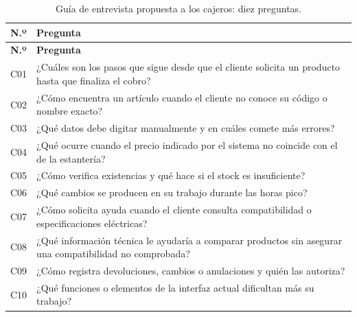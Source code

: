 \documentclass[onecolumn,12pt,a4paper]{IEEEtran}
\begin{document}
\begin{longtable}{@{}p{1.0cm}p{14.3cm}@{}}
\caption{Guía de entrevista propuesta a los cajeros: diez preguntas.}\label{tab:cajeros}\\
\toprule\textbf{N.º} & \textbf{Pregunta}\\\midrule\endfirsthead
\toprule\textbf{N.º} & \textbf{Pregunta}\\\midrule\endhead
C01 & ¿Cuáles son los pasos que sigue desde que el cliente solicita un producto hasta que finaliza el cobro?\\
C02 & ¿Cómo encuentra un artículo cuando el cliente no conoce su código o nombre exacto?\\
C03 & ¿Qué datos debe digitar manualmente y en cuáles comete más errores?\\
C04 & ¿Qué ocurre cuando el precio indicado por el sistema no coincide con el de la estantería?\\
C05 & ¿Cómo verifica existencias y qué hace si el stock es insuficiente?\\
C06 & ¿Qué cambios se producen en su trabajo durante las horas pico?\\
C07 & ¿Cómo solicita ayuda cuando el cliente consulta compatibilidad o especificaciones eléctricas?\\
C08 & ¿Qué información técnica le ayudaría a comparar productos sin asegurar una compatibilidad no comprobada?\\
C09 & ¿Cómo registra devoluciones, cambios o anulaciones y quién las autoriza?\\
C10 & ¿Qué funciones o elementos de la interfaz actual dificultan más su trabajo?\\
\bottomrule\end{longtable}
\end{document}
